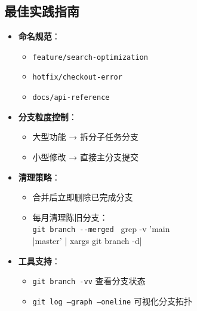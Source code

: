 \subsection{最佳实践指南}
\begin{itemize}[leftmargin=*, nosep]
    \item \textbf{命名规范}：
    \begin{itemize}[leftmargin=*, nosep]
        \item \texttt{feature/search-optimization}
        \item \texttt{hotfix/checkout-error}
        \item \texttt{docs/api-reference}
    \end{itemize}
    
    \item \textbf{分支粒度控制}：
    
\begin{itemize}[leftmargin=*, nosep]
        \item 大型功能 → 拆分子任务分支
        \item 小型修改 → 直接主分支提交
    \end{itemize}
    
    \item \textbf{清理策略}：
    
\begin{itemize}[leftmargin=*, nosep]
  \item 合并后立即删除已完成分支  
  \item 每月清理陈旧分支：\\
    \quad\verb|git branch --merged | grep -v 'main\\|master' | xargs git branch -d|  
\end{itemize}
    \item \textbf{工具支持}：
    
\begin{itemize}[leftmargin=*, nosep]
        \item \texttt{git branch -vv} 查看分支状态
        \item \texttt{git log --graph --oneline} 可视化分支拓扑
    \end{itemize}
\end{itemize}

